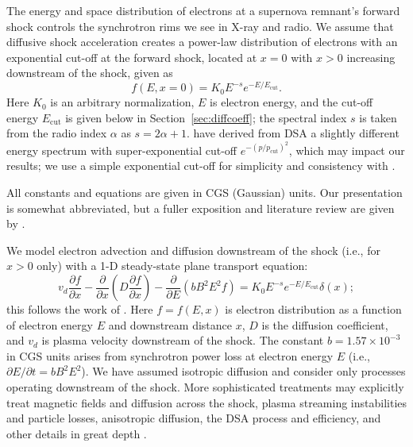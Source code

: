 \documentclass[manuscript]{aastex}  %
\newcommand*{\mt}{\mathrm}
\newcommand*{\ptl}{\partial}
\newcommand*{\Ecut}{E_{\mt{cut}}}
\begin{document}
The energy and space distribution of electrons at a supernova remnant's forward
shock controls the synchrotron rims we see in X-ray and radio.  We assume that
diffusive shock acceleration creates a power-law distribution of electrons with
an exponential cut-off at the forward shock, located at $x = 0$ with $x > 0$
increasing downstream of the shock, given as
\begin{equation}
    f(E, x=0) = K_0 E^{-s} e^{-E/\Ecut} .
\end{equation}
Here $K_0$ is an arbitrary normalization, $E$ is electron energy, and the
cut-off energy $\Ecut$ is given below in Section~\ref{sec:diffcoeff}; the
spectral index $s$ is taken from the radio index $\alpha$ as $s = 2\alpha + 1$.
\citet{zirakashvili2007} have derived from DSA a slightly different energy
spectrum with super-exponential cut-off $e^{-(p/p_{\mt{cut}})^2}$, which may
impact our results; we use a simple exponential cut-off for simplicity and
consistency with .

All constants and equations are given in CGS (Gaussian) units.  Our
presentation is somewhat abbreviated, but a fuller exposition and literature
review are given by .

We model electron advection and diffusion downstream of the shock (i.e., for
$x>0$ only) with a 1-D steady-state plane transport equation:
\begin{equation} \label{eq:model}
    v_d \frac{\ptl f}{\ptl x}
    - \frac{\ptl}{\ptl x} \left(D\frac{\ptl f}{\ptl x}\right)
    - \frac{\ptl}{\ptl E} \left(bB^2E^2f\right)
    = K_0 E^{-s} e^{-E/\Ecut} \delta(x) ;
\end{equation}
this follows the work of \citet{webb1984, berezhko2004, cassam-chenai2007,
morlino2010, rettig2012}.  Here $f = f(E,x)$ is electron distribution as a
function of electron energy $E$ and downstream distance $x$, $D$ is the
diffusion coefficient, and $v_d$ is plasma velocity downstream of the shock.
The constant $b = 1.57 \times 10^{-3}$ in CGS units arises from synchrotron
power loss at electron energy $E$ (i.e., $\ptl E/\ptl t = b B^2 E^2$).
We have assumed isotropic diffusion and consider only processes operating
downstream of the shock.  More sophisticated treatments may explicitly treat
magnetic fields and diffusion across the shock, plasma streaming instabilities
and particle losses, anisotropic diffusion, the DSA process and efficiency, and
other details in great depth \citep[e.g.,][and references therein]{reville2013,
bykov2014, ferrand2014}.
\end{document}
